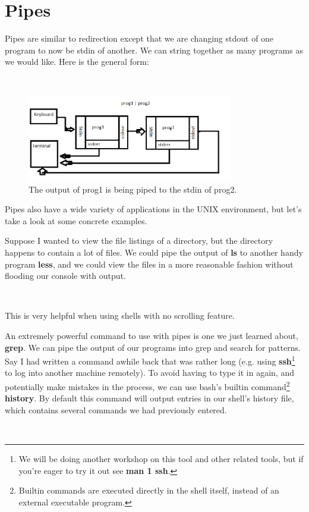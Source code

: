 \documentclass[oneside]{book}
\newcommand{\commandline}[1]{\begin{center} \colorbox{Dark}{\textcolor{white}{#1}} \end{center}}
\begin{document}
\section{Pipes}
Pipes are similar to redirection except that we are changing stdout of one program to now be stdin of another. We can string together as many programs as we would like. Here is the general form:
\commandline{prog1 $|$ prog2 $|$ prog3 ... $|$ progN}
\vspace{0.15cm}

    \begin{figure}[H]
    	\centering
    	\label{tab:directory_tree}
    	\includegraphics[width=90mm]{pipe_example.png}
    	\caption{The output of prog1 is being piped to the stdin of prog2.}
    \end{figure}

Pipes also have a wide variety of applications in the UNIX environment, but let's take a look at some concrete examples.

Suppose I wanted to view the file listings of a directory, but the directory happens to contain a lot of files. We could pipe the output of \textbf{ls} to another handy program \textbf{less}, and we could view the files in a more reasonable fashion without flooding our console with output.
\commandline{ls -al $\sim$ \textbar \ less}
\vspace{0.15}
This is very helpful when using shells with no scrolling feature.

An extremely powerful command to use with pipes is one we just learned about, \textbf{grep}. We can pipe the output of our programs into grep and search for patterns. Say I had written a command awhile back that was rather long (e.g. using \textbf{ssh}\footnote{We will be doing another workshop on this tool and other related tools, but if you're eager to try it out see \textbf{man 1 ssh}.} to log into another machine remotely). To avoid having to type it in again, and potentially make mistakes in the process, we can use bash's builtin command\footnote{Builtin commands are executed directly in the shell itself, instead of an external executable program.} \textbf{history}. By default this command will output entries in our shell's history file, which contains several commands we had previously entered.
\commandline{history \textbar \ grep [search expression]}
\vspace{0.15}
\end{document}

